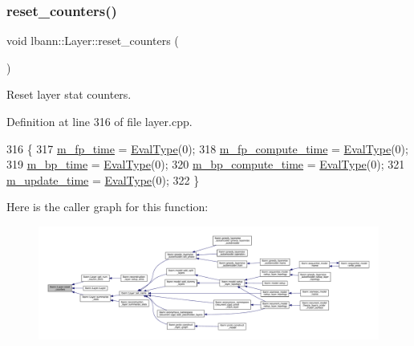 \mbox{\label{classlbann_1_1Layer_a979bb6891e6bf5edba2184cd0b59cf54}} 
\subsubsection{\texorpdfstring{reset\+\_\+counters()}{reset\_counters()}}
{\footnotesize\ttfamily void lbann\+::\+Layer\+::reset\+\_\+counters (\begin{DoxyParamCaption}{ }\end{DoxyParamCaption})\hspace{0.3cm}{\ttfamily [virtual]}}

Reset layer stat counters. 

Definition at line 316 of file layer.\+cpp.


\begin{DoxyCode}
316                            \{
317   \hyperlink{classlbann_1_1Layer_ab1bd9ab0a6f9e554f4dc936d8316028e}{m\_fp\_time}         = \hyperlink{base_8hpp_a3266f5ac18504bbadea983c109566867}{EvalType}(0);
318   \hyperlink{classlbann_1_1Layer_aa4e439c1d6a656e709dc4736c9380476}{m\_fp\_compute\_time} = \hyperlink{base_8hpp_a3266f5ac18504bbadea983c109566867}{EvalType}(0);
319   \hyperlink{classlbann_1_1Layer_aa60fc41627bcaa9c345775bf5737bb45}{m\_bp\_time}         = \hyperlink{base_8hpp_a3266f5ac18504bbadea983c109566867}{EvalType}(0);
320   \hyperlink{classlbann_1_1Layer_ae28626457a58943b25e7a2920fc271f0}{m\_bp\_compute\_time} = \hyperlink{base_8hpp_a3266f5ac18504bbadea983c109566867}{EvalType}(0);
321   \hyperlink{classlbann_1_1Layer_ab7d84533662b02d01ba6685ad6f20935}{m\_update\_time}     = \hyperlink{base_8hpp_a3266f5ac18504bbadea983c109566867}{EvalType}(0);
322 \}
\end{DoxyCode}
Here is the caller graph for this function\+:\nopagebreak
\begin{figure}[H]
\begin{center}
\leavevmode
\includegraphics[width=350pt]{classlbann_1_1Layer_a979bb6891e6bf5edba2184cd0b59cf54_icgraph}
\end{center}
\end{figure}
\mbox{\label{classlbann_1_1Layer_afce0efa0f1c8f3b1c61069536b2fa8cc}} 
